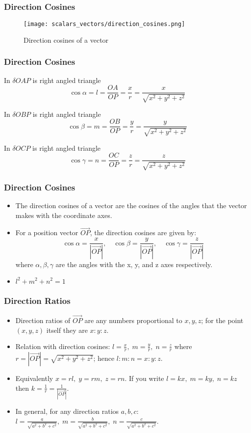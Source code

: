 \begin{frame}
    \frametitle{Direction Cosines}
    \begin{figure}
        \centering
        \texttt{[image: scalars\_vectors/direction\_cosines.png]}
        \caption{Direction cosines of a vector}
    \end{figure}
\end{frame}

\begin{frame}
    \frametitle{Direction Cosines}
    In $\delta OAP$ is right angled triangle 
    \[
    \cos \alpha = l = \frac{OA}{OP}  = \frac{x}{r} = \frac{x}{\sqrt{x^2 + y^2 + z^2}}
    \] 

    In $\delta OBP$ is right angled triangle
    \[
    \cos \beta = m = \frac{OB}{OP}  = \frac{y}{r} = \frac{y}{\sqrt{x^2 + y^2 + z^2}}
    \]

    In $\delta OCP$ is right angled triangle
    \[
    \cos \gamma = n = \frac{OC}{OP}  = \frac{z}{r} = \frac{z}{\sqrt{x^2 + y^2 + z^2}}
    \]
\end{frame}

\begin{frame}
    \frametitle{Direction Cosines}
    \begin{itemize}
        \item The direction cosines of a vector are the cosines of the angles that the vector makes with the coordinate axes.
        \item For a position vector \(\vec{OP}\), the direction cosines are given by:
        \[
        \cos \alpha = \frac{x}{|\vec{OP}|}, \quad \cos \beta = \frac{y}{|\vec{OP}|}, \quad \cos \gamma = \frac{z}{|\vec{OP}|}
        \]
        where \(\alpha, \beta, \gamma\) are the angles with the x, y, and z axes respectively.
        \item \(l^{2} + m^{2} + n^{2} = 1\)
    \end{itemize}
\end{frame}

\begin{frame}
    \frametitle{Direction Ratios}
    \begin{itemize}
        \item Direction ratios of \(\vec{OP}\) are any numbers proportional to \(x,y,z\); for the point \((x,y,z)\) itself they are \(x:y:z\).
        \item Relation with direction cosines: \(l=\frac{x}{r},\; m=\frac{y}{r},\; n=\frac{z}{r}\) where \(r=|\vec{OP}|=\sqrt{x^{2}+y^{2}+z^{2}}\); hence \(l:m:n = x:y:z\).
        \item Equivalently \(x = r l,\; y = r m,\; z = r n\). If you write \(l = kx,\; m = ky,\; n = kz\) then \(k = \tfrac{1}{r} = \tfrac{1}{|\vec{OP}|}\).
        \item In general, for any direction ratios \(a,b,c\): \(l = \frac{a}{\sqrt{a^{2}+b^{2}+c^{2}}},\; m = \frac{b}{\sqrt{a^{2}+b^{2}+c^{2}}},\; n = \frac{c}{\sqrt{a^{2}+b^{2}+c^{2}}}\).
    \end{itemize}
\end{frame}


